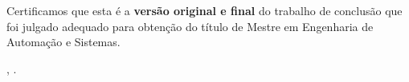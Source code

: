 \begin{folhadeaprovacao}
    Certificamos que esta é a \textbf{versão original e final} do trabalho de 
    conclusão que foi julgado adequado para obtenção do título de Mestre 
    em Engenharia de Automação e Sistemas.



    \assinatura{%
        \textbf{\imprimirorientador} \\ \imprimirorientadorRotulo\\
        \imprimirinstituicao
    }

    \ifnotempty{\imprimircoorientador}{%
        \assinatura{%
            \textbf{\imprimircoorientador} \\ \imprimircoorientadorRotulo \\
            \imprimirinstituicao
        }
    }

%
%
%
%
\vfill
    \begin{center}
        \imprimirlocal, \imprimirdata.
    \end{center}

\end{folhadeaprovacao}

